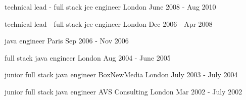 



\begin{cventries}

    \cventry
    {technical lead - full stack jee engineer}
    {}
    {London}
    {June 2008 - Aug 2010}
    {}
    {}

    \cventry
    {technical lead - full stack jee engineer}
    {}
    {London}
    {Dec 2006 - Apr 2008}
    {}
    {}

    \cventry
    {java engineer}
    {}
    {Paris}
    {Sep 2006 - Nov 2006}
    {}
    {}

    \cventry
    {full stack java engineer}
    {}
    {London}
    {Aug 2004 - June 2005}
    {}
    {}

    \cventry
    {junior full stack java engineer}
    {BoxNewMedia}
    {London}
    {July 2003 - July 2004}
    {}
    {}

    \cventry
    {junior full stack java engineer}
    {AVS Consulting}
    {London}
    {Mar 2002 - July 2002} %
    {}
    {}
\end{cventries}
